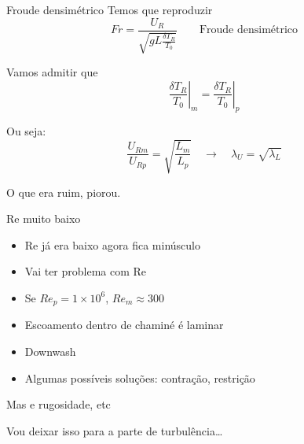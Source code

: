 \documentclass{beamer}
\newcommand{\lra}{\ensuremath{\longrightarrow}}
\newcommand{\qrq}{\ensuremath{\quad\lra\quad}}
\begin{document}
\begin{frame}{Froude densimétrico}
  Temos que reproduzir
  \[
  Fr = \frac{U_R}{\sqrt{g L \frac{\delta T_R}{T_0}}} \qquad \text{Froude densimétrico}
  \]

  Vamos admitir que
  \[
  \left.\frac{\delta T_R}{T_0}\right|_m =   \left.\frac{\delta T_R}{T_0}\right|_p
  \]

  Ou seja:
  \[
  \frac{U_{Rm}}{U_{Rp}} = \sqrt{ \frac{L_m}{L_p} } \qrq \lambda_U = \sqrt{\lambda_L}
  \]

  
  O que era ruim, piorou.
\end{frame}

\begin{frame}{Re muito baixo}
  \begin{itemize}
    \item Re já era baixo agora fica minúsculo
    \item Vai ter problema com Re
    \item Se $Re_p = 1\times 10^6$, $Re_m \approx 300$
    \item Escoamento dentro de chaminé é laminar
    \item Downwash
    \item Algumas possíveis soluções: contração, restrição
\end{itemize}
  
\end{frame}

\begin{frame}{Mas e rugosidade, etc}

  Vou deixar isso para a parte de turbulência\ldots
\end{frame}
\end{document}

